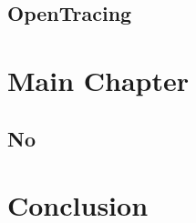 \documentclass[pdftex,titlepage]{article}
\begin{document}
        \subsection{OpenTracing}

        \newpage


    \section{Main Chapter}

    \subsection{No}

    \section{Conclusion}
    
\end{document}
